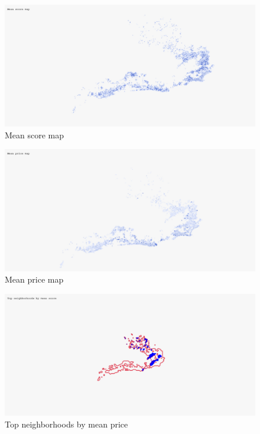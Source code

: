 \vspace{1em}
\begin{figure}[H]
    \centering
    \includegraphics[width=1\textwidth]{images/q6_1.jpg}
    \caption{Mean score map}
    \label{fig:figureq11}
\end{figure}

\vspace{1em}
\begin{figure}[H]
    \centering
    \includegraphics[width=1\textwidth]{images/q6_2.jpg}
    \caption{Mean price map}
    \label{fig:figureq12}
\end{figure}

\vspace{1em}
\begin{figure}[H]
    \centering
    \includegraphics[width=1\textwidth]{images/q6_3.jpg}
    \caption{Top neighborhoods by mean price}
    \label{fig:figureq13}
\end{figure}

